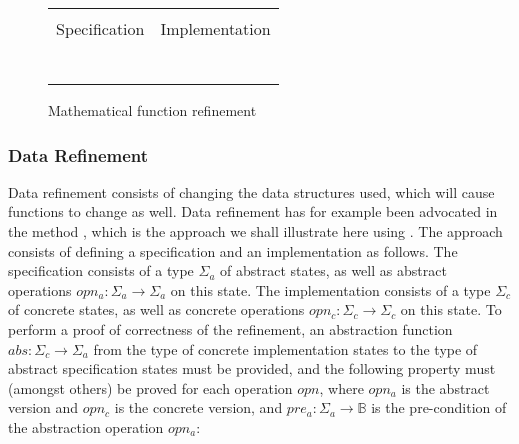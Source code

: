 \begin{figure}
  \centering
  \begin{tabular}[c]{c|c}
    \hline \\
    Specification & Implementation \\
    \hline\hline \\ \\
    \begin{subfigure}[c]{0.5\textwidth}
     
      \label{fig:prepost1}
    \end{subfigure}
    &
    \begin{subfigure}[c]{0.5\textwidth}
      
      \label{fig:prepost2}
    \end{subfigure}
    \\ \\
    \hline
  \end{tabular}    
  \caption{Mathematical function refinement}
  \label{fig:prepost}
\end{figure}

\subsubsection{Data Refinement}

Data refinement consists of changing the data structures used, which will
cause functions to change as well. Data refinement has for example been
advocated in the \vdm{} method 
\cite{vdm78,bjoerner-jones-82,jones90}, which is the approach we shall
illustrate here using \Klang. The approach consists of defining a specification 
and an implementation as follows. The specification consists of a type
$\Sigma_a$ of abstract states, as well as abstract operations $opn_a : \Sigma_a 
\rightarrow \Sigma_a$ on this state. The implementation consists of a type
$\Sigma_c$ of concrete states, as well as concrete operations $opn_c : \Sigma_c 
\rightarrow \Sigma_c$ on this state. To perform a proof of correctness of the 
refinement, an abstraction function $abs : \Sigma_c \rightarrow \Sigma_a$ from 
the type of concrete implementation states to the type of abstract specification 
states must be provided, and the following property must (amongst others) 
be proved for each operation $opn$, where $opn_a$ is the abstract version and $opn_c$ is the concrete version, and $pre_a : \Sigma_a \rightarrow \mathbb{B}$
is the pre-condition of the abstraction operation $opn_a$:

